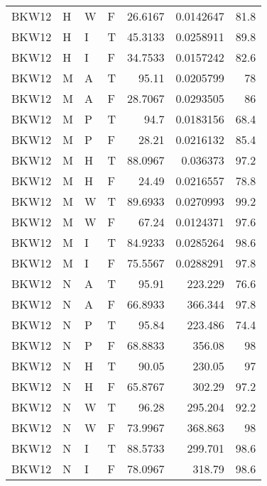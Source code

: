 \begin{table}[htb!]
{\begin{tabular}{llllrrr}
            BKW12    & H     & W     & F          & 26.6167    & 0.0142647  & 81.8     \\
            BKW12    & H     & I     & T          & 45.3133    & 0.0258911  & 89.8     \\
            BKW12    & H     & I     & F          & 34.7533    & 0.0157242  & 82.6     \\
            BKW12    & M     & A     & T          & 95.11      & 0.0205799  & 78       \\
            BKW12    & M     & A     & F          & 28.7067    & 0.0293505  & 86       \\
            BKW12    & M     & P     & T          & 94.7       & 0.0183156  & 68.4     \\
            BKW12    & M     & P     & F          & 28.21      & 0.0216132  & 85.4     \\
            BKW12    & M     & H     & T          & 88.0967    & 0.036373   & 97.2     \\
            BKW12    & M     & H     & F          & 24.49      & 0.0216557  & 78.8     \\
            BKW12    & M     & W     & T          & 89.6933    & 0.0270993  & 99.2     \\
            BKW12    & M     & W     & F          & 67.24      & 0.0124371  & 97.6     \\
            BKW12    & M     & I     & T          & 84.9233    & 0.0285264  & 98.6     \\
            BKW12    & M     & I     & F          & 75.5567    & 0.0288291  & 97.8     \\
            BKW12    & N     & A     & T          & 95.91      & 223.229    & 76.6     \\
            BKW12    & N     & A     & F          & 66.8933    & 366.344    & 97.8     \\
            BKW12    & N     & P     & T          & 95.84      & 223.486    & 74.4     \\
            BKW12    & N     & P     & F          & 68.8833    & 356.08     & 98       \\
            BKW12    & N     & H     & T          & 90.05      & 230.05     & 97       \\
            BKW12    & N     & H     & F          & 65.8767    & 302.29     & 97.2     \\
            BKW12    & N     & W     & T          & 96.28      & 295.204    & 92.2     \\
            BKW12    & N     & W     & F          & 73.9967    & 368.863    & 98       \\
            BKW12    & N     & I     & T          & 88.5733    & 299.701    & 98.6     \\
            BKW12    & N     & I     & F          & 78.0967    & 318.79     & 98.6     \\
            \hline
        \end{tabular}
    }{
    }
\end{table} 
